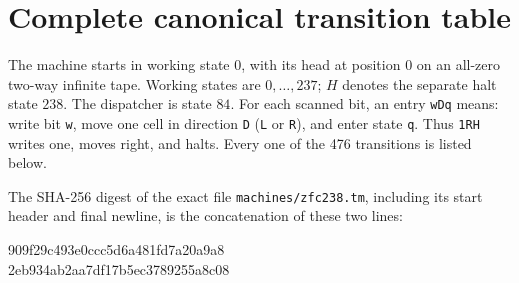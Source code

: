 \clearpage
\section{Complete canonical transition table}
\label{sec:complete-canonical-table}

The machine starts in working state $0$, with its head at position $0$ on
an all-zero two-way infinite tape.  Working states are $0,\ldots,237$;
$H$ denotes the separate halt state $238$.  The dispatcher is state $84$.
For each scanned bit, an entry \texttt{wDq} means: write bit \texttt{w},
move one cell in direction \texttt{D} (\texttt{L} or \texttt{R}), and enter
state \texttt{q}.  Thus \texttt{1RH} writes one, moves right, and halts.
Every one of the 476 transitions is listed below.

The SHA-256 digest of the exact file \texttt{machines/zfc238.tm}, including
its start header and final newline, is the concatenation of these two lines:
\begin{center}
\ttfamily\small
909f29c493e0ccc5d6a481fd7a20a9a8\\
2eb934ab2aa7df17b5ec3789255a8c08
\end{center}


